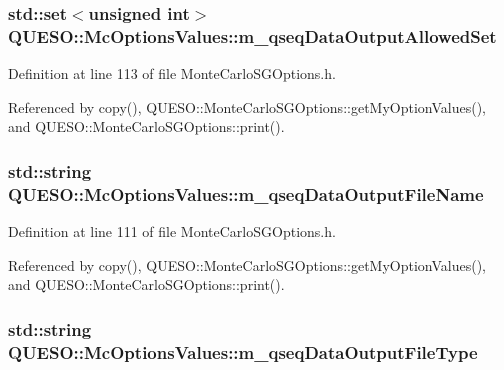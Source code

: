\hypertarget{class_q_u_e_s_o_1_1_mc_options_values_a15671d02e2a6fa2052361dde6342e263}{
\subsubsection[{m\-\_\-qseq\-Data\-Output\-Allowed\-Set}]{\setlength{\rightskip}{0pt plus 5cm}std\-::set$<$unsigned int$>$ Q\-U\-E\-S\-O\-::\-Mc\-Options\-Values\-::m\-\_\-qseq\-Data\-Output\-Allowed\-Set}}\label{class_q_u_e_s_o_1_1_mc_options_values_a15671d02e2a6fa2052361dde6342e263}


Definition at line 113 of file Monte\-Carlo\-S\-G\-Options.\-h.



Referenced by copy(), Q\-U\-E\-S\-O\-::\-Monte\-Carlo\-S\-G\-Options\-::get\-My\-Option\-Values(), and Q\-U\-E\-S\-O\-::\-Monte\-Carlo\-S\-G\-Options\-::print().

\hypertarget{class_q_u_e_s_o_1_1_mc_options_values_a1c2a61e5c129ba0c4c2455b75709feee}{
\subsubsection[{m\-\_\-qseq\-Data\-Output\-File\-Name}]{\setlength{\rightskip}{0pt plus 5cm}std\-::string Q\-U\-E\-S\-O\-::\-Mc\-Options\-Values\-::m\-\_\-qseq\-Data\-Output\-File\-Name}}\label{class_q_u_e_s_o_1_1_mc_options_values_a1c2a61e5c129ba0c4c2455b75709feee}


Definition at line 111 of file Monte\-Carlo\-S\-G\-Options.\-h.



Referenced by copy(), Q\-U\-E\-S\-O\-::\-Monte\-Carlo\-S\-G\-Options\-::get\-My\-Option\-Values(), and Q\-U\-E\-S\-O\-::\-Monte\-Carlo\-S\-G\-Options\-::print().

\hypertarget{class_q_u_e_s_o_1_1_mc_options_values_a4816ea4c0aef22cc5d2e9057ea44b73e}{
\subsubsection[{m\-\_\-qseq\-Data\-Output\-File\-Type}]{\setlength{\rightskip}{0pt plus 5cm}std\-::string Q\-U\-E\-S\-O\-::\-Mc\-Options\-Values\-::m\-\_\-qseq\-Data\-Output\-File\-Type}}\label{class_q_u_e_s_o_1_1_mc_options_values_a4816ea4c0aef22cc5d2e9057ea44b73e}


